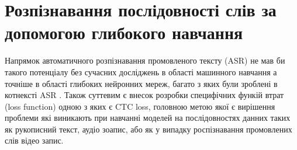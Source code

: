 \section{Розпізнавання послідовності слів за допомогою глибокого навчання}

Напрямок автоматичного розпізнавання промовленого тексту (ASR) не мав би такого потенціалу без сучасних досліджень в області машинного навчання а точніше в області глибоких нейронних мереж, багато з яких були зроблені в котнексті ASR \cite{graves2006connectionist,dahl2012context,hinton2012deep}. Також суттевим є внесок розробки специфічних функій втрат (loss function) одною з яких є CTC loss, головною метою якої є вирішення проблеми які виникають при навчанні моделей на послідовностях данних таких як рукописний текст, аудіо зоапис, або як у випадку роспізнавання промовлених слів відео запис. 


\begin{comment}

LipNet is the first end-to-end model that performs sentence-level sequence prediction for visual speech recogntion. That is, we 
demonstrate the first work that takes as input as sequence of images and outputs a distribution over sequences of tokens; it is 
trained end-to-end using CTC and thus also does not require alignments.
\end{comment}